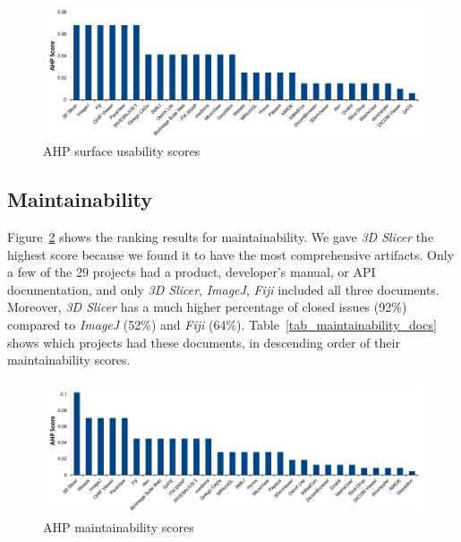 \documentclass[11pt]{article}
\begin{document}
\begin{figure}[!ht]
\includegraphics[scale=0.47]{usability_scores.pdf}
\caption{AHP surface usability scores}
\label{fg_usability_scores}
\end{figure}
 
\subsection{Maintainability} \label{sec_score_maintainability}

Figure~\ref{fg_maintainability_scores} shows the ranking results for
maintainability. We gave \textit{3D Slicer} the highest score because we found
it to have the most comprehensive artifacts. Only a few of the 29 projects had a
product, developer's manual, or API documentation, and only \textit{3D Slicer},
\textit{ImageJ}, \textit{Fiji} included all three documents. Moreover,
\textit{3D Slicer} has a much higher percentage of closed issues (92\%) compared
to \textit{ImageJ} (52\%) and \textit{Fiji} (64\%).
Table~\ref{tab_maintainability_docs} shows which projects had these documents,
in descending order of their maintainability scores. 

\begin{figure}[!ht]
\includegraphics[scale=0.47]{maintainability_scores.pdf}
\caption{AHP maintainability scores}
\label{fg_maintainability_scores}
\end{figure}
\end{document}
